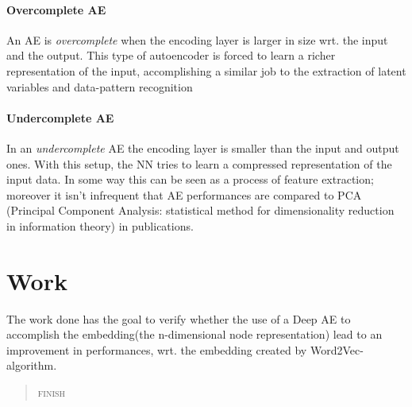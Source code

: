 \documentclass{article}
\begin{document}
			\paragraph{Overcomplete AE}
			An AE is \textit{overcomplete} when the encoding layer is larger in size wrt. the input and the output. This type of autoencoder is forced to learn a richer representation of the input, accomplishing a similar job to the extraction of latent variables and data-pattern recognition
			\paragraph{Undercomplete AE}
			In an \textit{undercomplete} AE the encoding layer is smaller than the input and output ones. With this setup, the NN tries to learn a compressed representation of the input data. In some way this can be seen as a process of feature extraction; moreover it isn't infrequent that AE performances are compared to PCA (Principal Component Analysis: statistical method for dimensionality reduction in information theory) in publications.
			\par \noindent \newline
			\begin{figure}[h!]
				\centerline{}
			\end{figure}
			\newpage
			
		\section{Work}
			The work done has the goal to verify whether the use of a Deep AE to accomplish the embedding(the n-dimensional node representation) lead to an improvement in performances, wrt. the embedding created by Word2Vec-algorithm.
			\begin{quote}
				\centering
				\textsc{finish}
			\end{quote}
			
\end{document}
